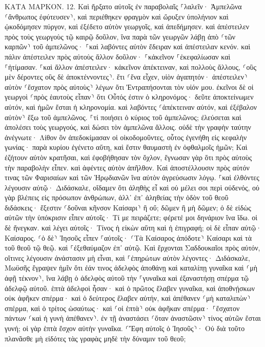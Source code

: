 \documentclass[twoside, 9pt]{extreport}
\begin{document}
ΚΑΤΑ ΜΑΡΚΟΝ.
12.
Καὶ ἤρξατο αὐτοῖς ἐν παραβολαῖς ⸀λαλεῖν· Ἀμπελῶνα ⸂ἄνθρωπος ἐφύτευσεν⸃, καὶ περιέθηκεν φραγμὸν καὶ ὤρυξεν ὑπολήνιον καὶ ᾠκοδόμησεν πύργον, καὶ ἐξέδετο αὐτὸν γεωργοῖς, καὶ ἀπεδήμησεν. 
καὶ ἀπέστειλεν πρὸς τοὺς γεωργοὺς τῷ καιρῷ δοῦλον, ἵνα παρὰ τῶν γεωργῶν λάβῃ ἀπὸ ⸂τῶν καρπῶν⸃ τοῦ ἀμπελῶνος· 
⸀καὶ λαβόντες αὐτὸν ἔδειραν καὶ ἀπέστειλαν κενόν. 
καὶ πάλιν ἀπέστειλεν πρὸς αὐτοὺς ἄλλον δοῦλον· ⸀κἀκεῖνον ⸀ἐκεφαλίωσαν καὶ ⸀ἠτίμασαν. 
⸀καὶ ἄλλον ἀπέστειλεν· κἀκεῖνον ἀπέκτειναν, καὶ πολλοὺς ἄλλους, ⸂οὓς μὲν δέροντες οὓς δὲ ἀποκτέννοντες⸃. 
ἔτι ⸂ἕνα εἶχεν, υἱὸν ἀγαπητόν· ἀπέστειλεν⸃ αὐτὸν ⸂ἔσχατον πρὸς αὐτοὺς⸃ λέγων ὅτι Ἐντραπήσονται τὸν υἱόν μου. 
ἐκεῖνοι δὲ οἱ γεωργοὶ ⸂πρὸς ἑαυτοὺς εἶπαν⸃ ὅτι Οὗτός ἐστιν ὁ κληρονόμος· δεῦτε ἀποκτείνωμεν αὐτόν, καὶ ἡμῶν ἔσται ἡ κληρονομία. 
καὶ λαβόντες ⸂ἀπέκτειναν αὐτόν, καὶ ἐξέβαλον αὐτὸν⸃ ἔξω τοῦ ἀμπελῶνος. 
⸀τί ποιήσει ὁ κύριος τοῦ ἀμπελῶνος; ἐλεύσεται καὶ ἀπολέσει τοὺς γεωργούς, καὶ δώσει τὸν ἀμπελῶνα ἄλλοις. 
οὐδὲ τὴν γραφὴν ταύτην ἀνέγνωτε· Λίθον ὃν ἀπεδοκίμασαν οἱ οἰκοδομοῦντες, οὗτος ἐγενήθη εἰς κεφαλὴν γωνίας· 
παρὰ κυρίου ἐγένετο αὕτη, καὶ ἔστιν θαυμαστὴ ἐν ὀφθαλμοῖς ἡμῶν; 
Καὶ ἐζήτουν αὐτὸν κρατῆσαι, καὶ ἐφοβήθησαν τὸν ὄχλον, ἔγνωσαν γὰρ ὅτι πρὸς αὐτοὺς τὴν παραβολὴν εἶπεν. καὶ ἀφέντες αὐτὸν ἀπῆλθον. 
Καὶ ἀποστέλλουσιν πρὸς αὐτόν τινας τῶν Φαρισαίων καὶ τῶν Ἡρῳδιανῶν ἵνα αὐτὸν ἀγρεύσωσιν λόγῳ. 
⸀καὶ ἐλθόντες λέγουσιν αὐτῷ· Διδάσκαλε, οἴδαμεν ὅτι ἀληθὴς εἶ καὶ οὐ μέλει σοι περὶ οὐδενός, οὐ γὰρ βλέπεις εἰς πρόσωπον ἀνθρώπων, ἀλλ᾽ ἐπ᾽ ἀληθείας τὴν ὁδὸν τοῦ θεοῦ διδάσκεις· ἔξεστιν ⸂δοῦναι κῆνσον Καίσαρι⸃ ἢ οὔ; δῶμεν ἢ μὴ δῶμεν; 
ὁ δὲ εἰδὼς αὐτῶν τὴν ὑπόκρισιν εἶπεν αὐτοῖς· Τί με πειράζετε; φέρετέ μοι δηνάριον ἵνα ἴδω. 
οἱ δὲ ἤνεγκαν. καὶ λέγει αὐτοῖς· Τίνος ἡ εἰκὼν αὕτη καὶ ἡ ἐπιγραφή; οἱ δὲ εἶπαν αὐτῷ· Καίσαρος. 
⸂ὁ δὲ⸃ Ἰησοῦς εἶπεν ⸀αὐτοῖς· ⸂Τὰ Καίσαρος ἀπόδοτε⸃ Καίσαρι καὶ τὰ τοῦ θεοῦ τῷ θεῷ. καὶ ⸀ἐξεθαύμαζον ἐπ᾽ αὐτῷ. 
Καὶ ἔρχονται Σαδδουκαῖοι πρὸς αὐτόν, οἵτινες λέγουσιν ἀνάστασιν μὴ εἶναι, καὶ ⸀ἐπηρώτων αὐτὸν λέγοντες· 
Διδάσκαλε, Μωϋσῆς ἔγραψεν ἡμῖν ὅτι ἐάν τινος ἀδελφὸς ἀποθάνῃ καὶ καταλίπῃ γυναῖκα καὶ ⸂μὴ ἀφῇ τέκνον⸃, ἵνα λάβῃ ὁ ἀδελφὸς αὐτοῦ τὴν ⸀γυναῖκα καὶ ἐξαναστήσῃ σπέρμα τῷ ἀδελφῷ αὐτοῦ. 
ἑπτὰ ἀδελφοὶ ἦσαν· καὶ ὁ πρῶτος ἔλαβεν γυναῖκα, καὶ ἀποθνῄσκων οὐκ ἀφῆκεν σπέρμα· 
καὶ ὁ δεύτερος ἔλαβεν αὐτήν, καὶ ἀπέθανεν ⸂μὴ καταλιπὼν⸃ σπέρμα, καὶ ὁ τρίτος ὡσαύτως· 
καὶ ⸂οἱ ἑπτὰ⸃ οὐκ ἀφῆκαν σπέρμα· ⸀ἔσχατον πάντων ⸂καὶ ἡ γυνὴ ἀπέθανεν⸃. 
ἐν τῇ ἀναστάσει ⸂ὅταν ἀναστῶσιν⸃ τίνος αὐτῶν ἔσται γυνή; οἱ γὰρ ἑπτὰ ἔσχον αὐτὴν γυναῖκα. 
⸂Ἔφη αὐτοῖς ὁ Ἰησοῦς⸃· Οὐ διὰ τοῦτο πλανᾶσθε μὴ εἰδότες τὰς γραφὰς μηδὲ τὴν δύναμιν τοῦ θεοῦ; 
\end{document}
